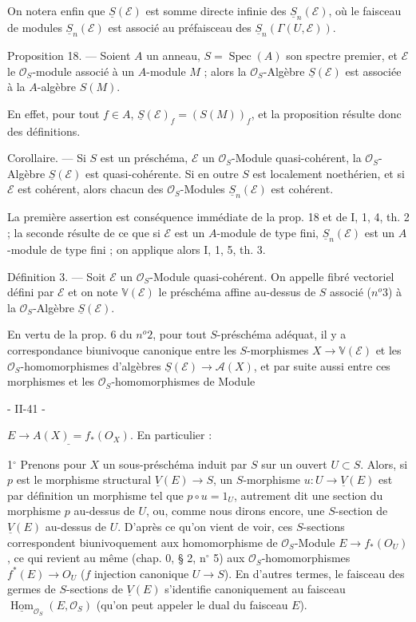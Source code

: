 On notera enfin que $\underline{S}(\mathcal{E})$ est somme directe infinie des $\underline{S}_n(\mathcal{E})$, où le faisceau de modules $\underline{S}_n(\mathcal{E})$ est associé au préfaisceau des $\underline{S}_n(\Gamma(U, \mathcal{E}))$.

Proposition 18. — Soient $A$ un anneau, $S = \operatorname{Spec}(A)$ son spectre premier, et $\mathcal{E}$ le $\mathcal{O}_S$-module associé à un $A$-module $M$ ; alors la $\mathcal{O}_S$-Algèbre $\underline{S}(\mathcal{E})$ est associée à la $A$-algèbre $S(M)$.

En effet, pour tout $f \in A$, $\underline{S}(\mathcal{E})_f = (S(M))_f$, et la proposition résulte donc des définitions.

Corollaire. — Si $S$ est un préschéma, $\mathcal{E}$ un $\mathcal{O}_S$-Module quasi-cohérent, la $\mathcal{O}_S$-Algèbre $\underline{S}(\mathcal{E})$ est quasi-cohérente. Si en outre $S$ est localement noethérien, et si $\mathcal{E}$ est cohérent, alors chacun des $\mathcal{O}_S$-Modules $\underline{S}_n(\mathcal{E})$ est cohérent.

La première assertion est conséquence immédiate de la prop. 18 et de I, 1, 4, th. 2 ; la seconde résulte de ce que si $\mathcal{E}$ est un $A$-module de type fini, $\underline{S}_n(\mathcal{E})$ est un $A$-module de type fini ; on applique alors I, 1, 5, th. 3.

Définition 3. — Soit $\mathcal{E}$ un $\mathcal{O}_S$-Module quasi-cohérent. On appelle fibré vectoriel défini par $\mathcal{E}$ et on note $\mathbb{V}(\mathcal{E})$ le préschéma affine au-dessus de $S$ associé ($n^o 3$) à la $\mathcal{O}_S$-Algèbre $\underline{S}(\mathcal{E})$.

En vertu de la prop. 6 du $n^o 2$, pour tout $S$-préschéma adéquat, il y a correspondance biunivoque canonique entre les $S$-morphismes $X \to \mathbb{V}(\mathcal{E})$ et les $\mathcal{O}_S$-homomorphismes d'algèbres $\underline{S}(\mathcal{E}) \to \mathcal{A}(X)$, et par suite aussi entre ces morphismes et les $\mathcal{O}_S$-homomorphismes de Module

\newpage


- II-41 -

$\underline{E \to A(X) = f_*(O_X)}$. En particulier :

1$^\circ$ Prenons pour $X$ un sous-préschéma induit par $S$ sur un ouvert $U \subset S$. Alors, si $p$ est le morphisme structural $\underline{V}(E) \to S$, un $S$-morphisme $u : U \to \underline{V}(E)$ est par définition un morphisme tel que $p \circ u = 1_U$, autrement dit une section du morphisme $p$ au-dessus de $U$, ou, comme nous dirons encore, une $S$-section de $\underline{V}(E)$ au-dessus de $U$. D'après ce qu'on vient de voir, ces $S$-sections correspondent biunivoquement aux homomorphisme de $\mathcal{O}_S$-Module $E \to f_*(O_U)$, ce qui revient au même (chap. 0, § 2, n$^\circ$ 5) aux $\mathcal{O}_S$-homomorphismes $f^*(E) \to O_U$ ($f$ injection canonique $U \to S$). En d'autres termes, le faisceau des germes de $S$-sections de $\underline{V}(E)$ s'identifie canoniquement au faisceau $\underline{\operatorname{Hom}}_{\mathcal{O}_S}(E, \mathcal{O}_S)$ (qu'on peut appeler le dual du faisceau $E$).

